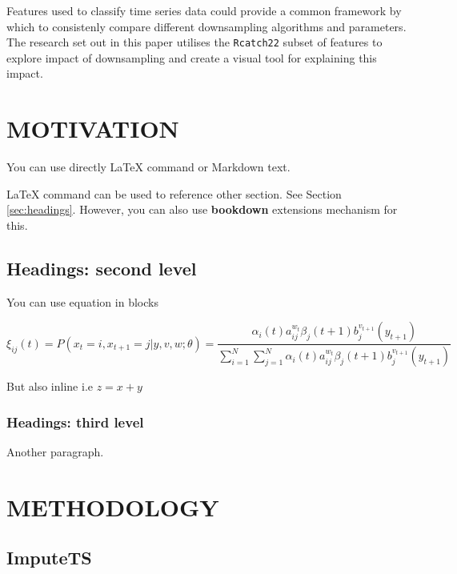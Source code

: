 \documentclass{article}
\begin{document}
Features used to classify time series data could provide a common
framework by which to consistenly compare different downsampling
algorithms and parameters. The research set out in this paper utilises
the \texttt{Rcatch22} subset of features to explore impact of
downsampling and create a visual tool for explaining this impact.

\hypertarget{motivation}{%
\section{MOTIVATION}\label{motivation}}

\label{sec:headings}

\onecolumn

You can use directly LaTeX command or Markdown text.

LaTeX command can be used to reference other section. See Section
\ref{sec:headings}. However, you can also use \textbf{bookdown}
extensions mechanism for this.

\hypertarget{headings-second-level}{%
\subsection{Headings: second level}\label{headings-second-level}}

You can use equation in blocks

\[
\xi _{ij}(t)=P(x_{t}=i,x_{t+1}=j|y,v,w;\theta)= {\frac {\alpha _{i}(t)a^{w_t}_{ij}\beta _{j}(t+1)b^{v_{t+1}}_{j}(y_{t+1})}{\sum _{i=1}^{N} \sum _{j=1}^{N} \alpha _{i}(t)a^{w_t}_{ij}\beta _{j}(t+1)b^{v_{t+1}}_{j}(y_{t+1})}}
\]

But also inline i.e \(z=x+y\)

\hypertarget{headings-third-level}{%
\subsubsection{Headings: third level}\label{headings-third-level}}

Another paragraph.

\hypertarget{methodology}{%
\section{METHODOLOGY}\label{methodology}}

\label{sec:headings}

\hypertarget{imputets}{%
\subsection{ImputeTS}\label{imputets}}
\end{document}
